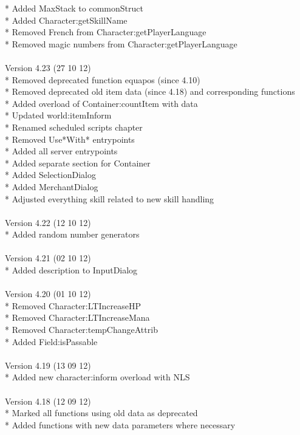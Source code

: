 \documentclass[a4paper,10pt,makeidx]{scrreprt}
\begin{document}
* Added MaxStack to commonStruct\\
* Added Character:getSkillName\\
* Removed French from Character:getPlayerLanguage\\
* Removed magic numbers from Character:getPlayerLanguage\\
\\
Version 4.23 (27 10 12)\\
* Removed deprecated function equapos (since 4.10)\\
* Removed deprecated old item data (since 4.18) and corresponding functions\\
* Added overload of Container:countItem with data\\
* Updated world:itemInform\\
* Renamed scheduled scripts chapter\\
* Removed Use*With* entrypoints\\
* Added all server entrypoints\\
* Added separate section for Container\\
* Added SelectionDialog\\
* Added MerchantDialog\\
* Adjusted everything skill related to new skill handling\\
\\
Version 4.22 (12 10 12)\\
* Added random number generators\\
\\
Version 4.21 (02 10 12)\\
* Added description to InputDialog\\
\\
Version 4.20 (01 10 12)\\
* Removed Character:LTIncreaseHP\\
* Removed Character:LTIncreaseMana\\
* Removed Character:tempChangeAttrib\\
* Added Field:isPassable\\
\\
Version 4.19 (13 09 12)\\
* Added new character:inform overload with NLS\\
\\
Version 4.18 (12 09 12)\\
* Marked all functions using old data as deprecated\\
* Added functions with new data parameters where necessary\\
\end{document}
